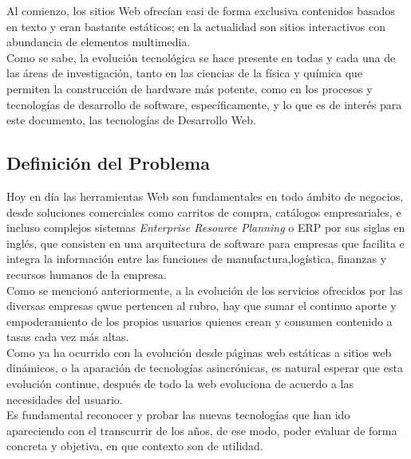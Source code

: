 Al comienzo, los sitios Web ofrecían casi de forma exclusiva contenidos basados en texto 
y eran bastante estáticos; en la actualidad son sitios interactivos con abundancia de elementos multimedia.\\


Como se sabe, la evolución tecnológica se hace presente en todas y cada una de las áreas de investigación, 
tanto en las ciencias de la física y química que permiten la construcción de hardware más potente, como en 
los procesos y tecnologías de desarrollo de software, específicamente, y lo que es de interés para este documento, 
las tecnologías de Desarrollo Web.\\


\subsection{Definición del Problema}

Hoy en día las herramientas Web son fundamentales en todo ámbito de negocios, desde soluciones comerciales
como carritos de compra, catálogos empresariales, e incluso complejos sistemas \textit{Enterprise Resource
Planning} o ERP por sus siglas en inglés, que consisten en una arquitectura de software para empresas que 
facilita e integra la información entre las funciones de manufactura,logística, finanzas y recursos humanos 
de la empresa.\\

Como se mencionó anteriormente, a la evolución de los servicios ofrecidos por las diversas empresas qwue pertencen
al rubro, hay que sumar el continuo aporte y empoderamiento de los propios usuarios quienes crean y consumen
contenido a tasas cada vez más altas.\\

Como ya ha ocurrido con la evolución desde páginas web estáticas a sitios web dinámicos, o la aparación de tecnologías
asincrónicas, es natural esperar que esta evolución continue, después de todo la web evoluciona de acuerdo a las 
necesidades del usuario.\\

Es fundamental reconocer y probar las nuevas tecnologías que han ido apareciendo con el transcurrir de los años,
de ese modo, poder evaluar de forma concreta y objetiva, en que contexto son de utilidad.\\



